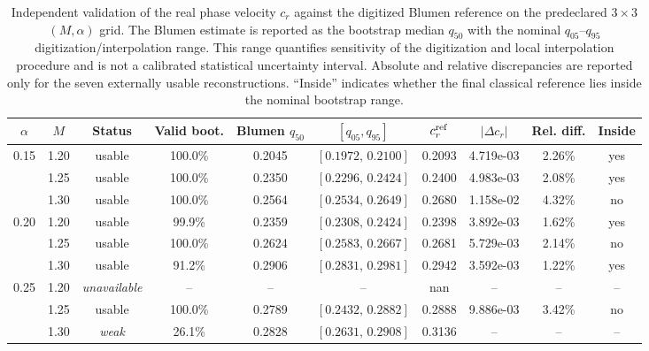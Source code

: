 \begin{table}[t]
\centering
\caption{
Independent validation of the real phase velocity $c_r$ against the
digitized Blumen reference on the predeclared $3\times3$ $(M,\alpha)$
grid. The Blumen estimate is reported as the bootstrap median $q_{50}$
with the nominal $q_{05}$--$q_{95}$ digitization/interpolation range.
This range quantifies sensitivity of the digitization and local
interpolation procedure and is not a calibrated statistical uncertainty
interval. Absolute and relative discrepancies are reported only for the
seven externally usable reconstructions. ``Inside'' indicates whether the
final classical reference lies inside the nominal bootstrap range.
}
\label{tab:blumen_cr_validation}
\scriptsize
\setlength{\tabcolsep}{3.2pt}
\begin{tabular}{cccccccccc}
\toprule
$\alpha$
& $M$
& Status
& Valid boot.
& Blumen $q_{50}$
& $[q_{05},q_{95}]$
& $c_r^{\rm ref}$
& $|\Delta c_r|$
& Rel. diff.
& Inside \\
\midrule
0.15 & 1.20 & usable & 100.0\% & 0.2045 & $[0.1972,\,0.2100]$ & 0.2093 & 4.719e-03 & 2.26\% & yes \\
 & 1.25 & usable & 100.0\% & 0.2350 & $[0.2296,\,0.2424]$ & 0.2400 & 4.983e-03 & 2.08\% & yes \\
 & 1.30 & usable & 100.0\% & 0.2564 & $[0.2534,\,0.2649]$ & 0.2680 & 1.158e-02 & 4.32\% & no \\
\midrule
0.20 & 1.20 & usable & 99.9\% & 0.2359 & $[0.2308,\,0.2424]$ & 0.2398 & 3.892e-03 & 1.62\% & yes \\
 & 1.25 & usable & 100.0\% & 0.2624 & $[0.2583,\,0.2667]$ & 0.2681 & 5.729e-03 & 2.14\% & no \\
 & 1.30 & usable & 91.2\% & 0.2906 & $[0.2831,\,0.2981]$ & 0.2942 & 3.592e-03 & 1.22\% & yes \\
\midrule
0.25 & 1.20 & \textit{unavailable} & -- & -- & -- & nan & -- & -- & -- \\
 & 1.25 & usable & 100.0\% & 0.2789 & $[0.2432,\,0.2882]$ & 0.2888 & 9.886e-03 & 3.42\% & no \\
 & 1.30 & \textit{weak} & 26.1\% & 0.2828 & $[0.2631,\,0.2908]$ & 0.3136 & -- & -- & -- \\
\bottomrule
\end{tabular}
\end{table}
